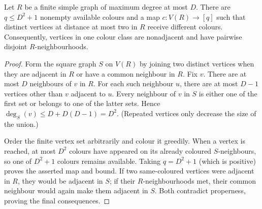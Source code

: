 \begin{lemma}
Let $R$ be a finite simple graph of maximum degree at most $D$.  There are
$q\leq D^2+1$ nonempty available colours and a map
$c:V(R)\to[q]$ such that distinct vertices at distance at most two in $R$
receive different colours.  Consequently, vertices in one colour class are
nonadjacent and have pairwise disjoint $R$-neighbourhoods.
\end{lemma}
\begin{proof}
Form the square graph $S$ on $V(R)$ by joining two distinct vertices when
they are adjacent in $R$ or have a common neighbour in $R$.  Fix $v$.
There are at most $D$ neighbours of $v$ in $R$.  For each such neighbour
$u$, there are at most $D-1$ vertices other than $v$ adjacent to $u$.
Every neighbour of $v$ in $S$ is either one of the first set or belongs to
one of the latter sets.  Hence
$\deg_S(v)\leq D+D(D-1)=D^2$.  (Repeated vertices only decrease the size of
the union.)

Order the finite vertex set arbitrarily and colour it greedily.  When a
vertex is reached, at most $D^2$ colours have appeared on its already
coloured $S$-neighbours, so one of $D^2+1$ colours remains available.
Taking $q=D^2+1$ (which is positive) proves the asserted map and bound.
If two same-coloured vertices were adjacent in $R$, they would be adjacent
in $S$; if their $R$-neighbourhoods met, their common neighbour would again
make them adjacent in $S$.  Both contradict properness, proving the final
consequences.
\end{proof}
